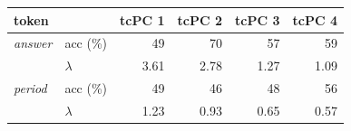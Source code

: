     \begin{tabular}{llrrrr}
    \toprule
    token & & tcPC 1 & tcPC 2 & tcPC 3 & tcPC 4 \\
    \midrule
    \textit{answer} & acc (\%) & 49 & 70 & 57 & 59 \\
     & $\lambda$ & 3.61 & 2.78 & 1.27 & 1.09 \\
    \textit{period} & acc (\%) & 49 & 46 & 48 & 56 \\
     & $\lambda$ & 1.23 & 0.93 & 0.65 & 0.57 \\
    \bottomrule
    \end{tabular}
